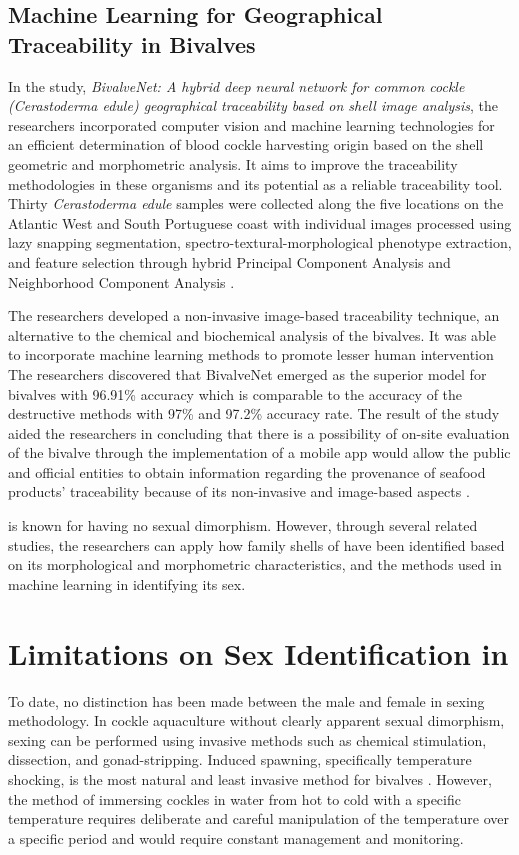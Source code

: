 \subsection{Machine Learning for Geographical Traceability in Bivalves}
In the study, \textit{BivalveNet: A hybrid deep neural network for common cockle (Cerastoderma edule) geographical traceability based on shell image analysis}, the researchers incorporated computer vision and machine learning technologies for an efficient determination of blood cockle harvesting origin based on the shell geometric and morphometric analysis. It aims to improve the traceability methodologies in these organisms and its potential as a reliable traceability tool. Thirty \textit{Cerastoderma edule} samples were collected along the five locations on the Atlantic West and South Portuguese coast with individual images processed using lazy snapping segmentation, spectro-textural-morphological phenotype extraction, and feature selection through hybrid Principal Component Analysis and Neighborhood Component Analysis \cite{concepcion2023}. 

The researchers developed a non-invasive image-based traceability technique, an alternative to the chemical and biochemical analysis of the bivalves. It was able to incorporate machine learning methods to promote lesser human intervention The researchers discovered that BivalveNet emerged as the superior model for bivalves with 96.91\% accuracy which is comparable to the accuracy of the destructive methods with 97\% and 97.2\% accuracy rate. The result of the study aided the researchers in concluding that there is a possibility of on-site evaluation of the bivalve through the implementation of a mobile app would allow the public and official entities to obtain information regarding the provenance of seafood products’ traceability because of its non-invasive and image-based aspects \cite{concepcion2023}.


\Tegillarcagranosa is known for having no sexual dimorphism. However, through several related studies, the researchers can apply how family shells of \Tegillarcagranosa have been identified based on its morphological and morphometric characteristics, and the methods used in machine learning in identifying its sex. 

\section{Limitations on Sex Identification in \Tegillarcagranosa}
To date, no distinction has been made between the male and female \Tgranosa in sexing methodology. In cockle aquaculture without clearly apparent sexual dimorphism, sexing can be performed using invasive methods such as chemical stimulation, dissection, and gonad-stripping. Induced spawning, specifically temperature shocking, is the most natural and least invasive method for bivalves \cite{aji}. However, the method \cite{wong2018} of immersing cockles in water from hot to cold with a specific temperature requires deliberate and careful manipulation of the temperature over a specific period and would require constant management and monitoring.

